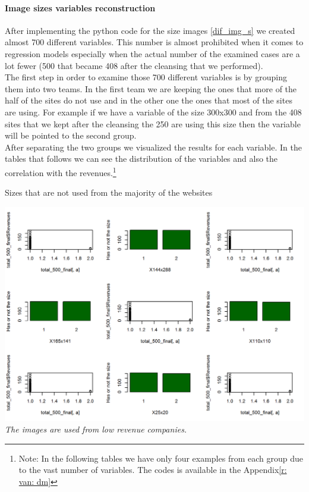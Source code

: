 \documentclass{article}
\begin{document}
\paragraph{Image sizes variables reconstruction}
After implementing the python code for the size images \ref{dif_img_s} we created almost 700 different variables. This number is almost prohibited when it comes to regression models especially when the actual number of the examined cases are a lot fewer (500 that became 408 after the cleansing that we performed).\\
The first step in order to examine those 700 different variables is by grouping them into two teams. In the first team we are keeping the ones that more of the half of the sites do not use and in the other one the ones that most of the sites are using. For example if we have a variable of the size 300x300 and from the 408 sites that we kept after the cleansing the 250 are using this size then the variable will be pointed to the second group.\\
After separating the two groups we visualized the results for each variable. In the tables that follows we can see the distribution of the variables and also the correlation with the revenues.\footnote{Note: In the following tables we have only four examples from each group due to the vast number of variables. The codes is available in the Appendix\ref{r: van: dm}}
\begin{table}[H]
\centering
\caption{Sizes that are not used from the majority of the websites}
\begin{center}
\includegraphics[scale=0.5]{../R/photos/64_size_no.png}    \\
\textit{The images are used from low revenue companies.}
\end{center}
\end{table}
\end{document}
